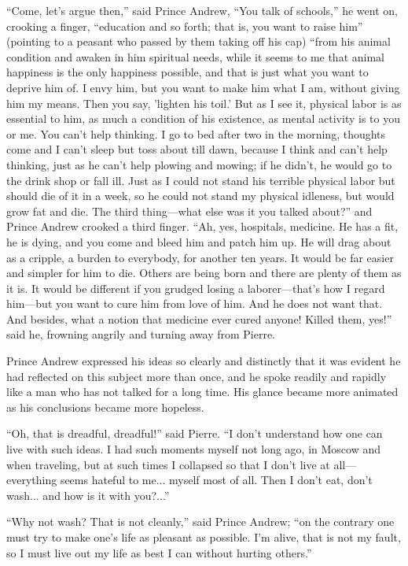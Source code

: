 ``Come, let's argue then,'' said Prince Andrew, ``You talk of
schools,'' he went on, crooking a finger, ``education and so
forth; that is, you want to raise him'' (pointing to a peasant
who passed by them taking off his cap) ``from his animal
condition and awaken in him spiritual needs, while it seems to me
that animal happiness is the only happiness possible, and that is
just what you want to deprive him of. I envy him, but you want to
make him what I am, without giving him my means. Then you say,
'lighten his toil.' But as I see it, physical labor is as
essential to him, as much a condition of his existence, as mental
activity is to you or me. You can't help thinking. I go to bed
after two in the morning, thoughts come and I can't sleep but
toss about till dawn, because I think and can't help thinking,
just as he can't help plowing and mowing; if he didn't, he would
go to the drink shop or fall ill. Just as I could not stand his
terrible physical labor but should die of it in a week, so he
could not stand my physical idleness, but would grow fat and
die. The third thing---what else was it you talked about?'' and
Prince Andrew crooked a third finger. ``Ah, yes, hospitals,
medicine. He has a fit, he is dying, and you come and bleed him
and patch him up. He will drag about as a cripple, a burden to
everybody, for another ten years. It would be far easier and
simpler for him to die. Others are being born and there are
plenty of them as it is. It would be different if you grudged
losing a laborer---that's how I regard him---but you want to cure
him from love of him. And he does not want that. And besides,
what a notion that medicine ever cured anyone! Killed them,
yes!'' said he, frowning angrily and turning away from Pierre.

Prince Andrew expressed his ideas so clearly and distinctly that
it was evident he had reflected on this subject more than once,
and he spoke readily and rapidly like a man who has not talked
for a long time. His glance became more animated as his
conclusions became more hopeless.

``Oh, that is dreadful, dreadful!'' said Pierre. ``I don't
understand how one can live with such ideas. I had such moments
myself not long ago, in Moscow and when traveling, but at such
times I collapsed so that I don't live at all---everything seems
hateful to me... myself most of all. Then I don't eat, don't
wash... and how is it with you?...''

``Why not wash? That is not cleanly,'' said Prince Andrew; ``on
the contrary one must try to make one's life as pleasant as
possible. I'm alive, that is not my fault, so I must live out my
life as best I can without hurting others.''

